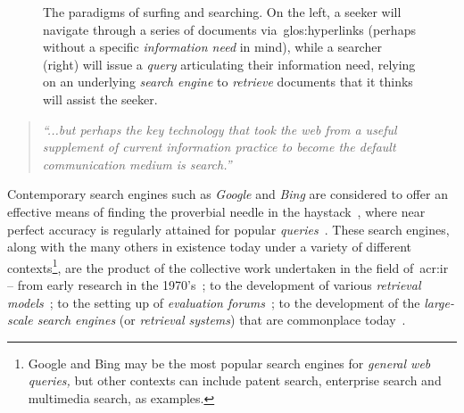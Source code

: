 \begin{figure}[t!]
    \centering
    \caption[Surfing vs. Searching]{The paradigms of surfing and searching. On the left, a seeker will navigate through a series of documents via~\glspl{glos:hyperlink} (perhaps without a specific \emph{information need} in mind), while a searcher (right) will issue a \emph{query} articulating their information need, relying on an underlying \emph{search engine} to \emph{retrieve} documents that it thinks will assist the seeker.}
    \label{fig:ch1-surfing}
\end{figure}

\begin{quote}
    \emph{``...but perhaps the key technology that took the web from a useful supplement of current information practice to become the default communication medium is search.''}
\end{quote}

Contemporary search engines such as \emph{Google} and \emph{Bing} are considered to offer an effective means of finding the proverbial needle in the haystack~\citep{wilson2010keyword_search}, where near perfect accuracy is regularly attained for popular \emph{queries}~\citep{vaughan2004new_measurements}. These search engines, along with the many others in existence today under a variety of different contexts\footnote{Google and Bing may be the most popular search engines for \emph{general web queries,} but other contexts can include patent search, enterprise search and multimedia search, as examples.}, are the product of the collective work undertaken in the field of~\gls{acr:ir} -- from early research in the 1970's~\citep{cleverdon1962cranfield_experiments,rijsbergen1979ir}; to the development of various \emph{retrieval models}~\citep{robertson2009probabilistic_models}; to the setting up of \emph{evaluation forums}~\citep{harman1993trec1}; to the development of the \emph{large-scale search engines} (or \emph{retrieval systems}) that are commonplace today~\citep{baezayates1999modern_ir, wang2010language_models}.

